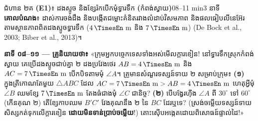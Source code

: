 \documentclass[a4paper,12pt]{article}
\newcommand{\en}[1]{{\TimesEn #1}}
\newcommand{\enbf}[1]{{\TimesEn\textbf{#1}}}
\newcommand{\unit}[1]{\,\text{\en{#1}}}
\newcommand{\tri}[1]{\ensuremath{\triangle #1}}
\newcommand{\ang}[1]{\ensuremath{\angle #1}}
\begin{document}
\Needspace{2.0cm}
\begin{phasebox}{ជំហាន ២គ \enbf{(E1)}៖ ដងស្ទូច និងខ្សែរ៉កបើកមុំទ្វារទឹក \enbf{(}កំពង់ស្វាយ\enbf{)}}{08--11 min}{3 នាទី}
\textbf{គោលបំណង}៖ ដាស់ការចង់ដឹង និងបង្កើតជម្លោះគំនិតរវាងលំដាប់វិសមភាព និងផលធៀបលីនេអ៊ែរ តាមស្ថានភាពពិតដងស្ទូចទ្វារទឹក ($4\unit{m}$ និង $7\unit{m}$) \en{(De Bock et al., 2003; Biber et al., 2013)}។
\end{phasebox}
\begin{scriptbox}
  \textbf{នាទី ០៨--១១ — គ្រូនិយាយថា៖} «ក្រុមអ្នកបច្ចេកទេសទាំងអស់មើលក្ដារខៀន! នៅទ្វារទឹកស្រុកកំពង់ស្វាយ គេប្រើដងស្ទូចជាប់គ្នា ២ ដងប្រវែងថេរ $AB=4\unit{m}$ និង $AC=7\unit{m}$ បើកបិទតាមមុំ $\ang{A}$។ គ្រូមានសំណួរទស្សន៍ទាយ ២ សម្រាប់ក្រុម៖ \textbf{(១)} ក្នុងត្រីកោណតែមួយ $\tri{ABC}$ ដែល $AC=7\unit{m} > AB=4\unit{m}$ ហេតុអ្វីមុំ $\ang{B}$ ឈមខ្សែ $7\unit{m}$ តែងធំជាងមុំ $\ang{C}$ ជានិច្ច? \textbf{(២)} បើបង្វែរហ៊ីង $\ang{A}$ ពី $30^\circ$ ទៅ $60^\circ$ (កើនគុណ ២) តើខ្សែកាបឈម $B'C'$ វែងគុណនឹង ២ នៃ $BC$ ដែរឬទេ? (ស្រង់ចម្លើយទស្សន៍ទាយសិស្សកត់ទុកលើក្ដារខៀន \textbf{ដោយមិនទាន់ប្រាប់ចម្លើយ}!) តោះស៊ើបអង្កេតដោយពិសោធន៍ផ្ទាល់ដៃ!»
\end{scriptbox}
\end{document}
